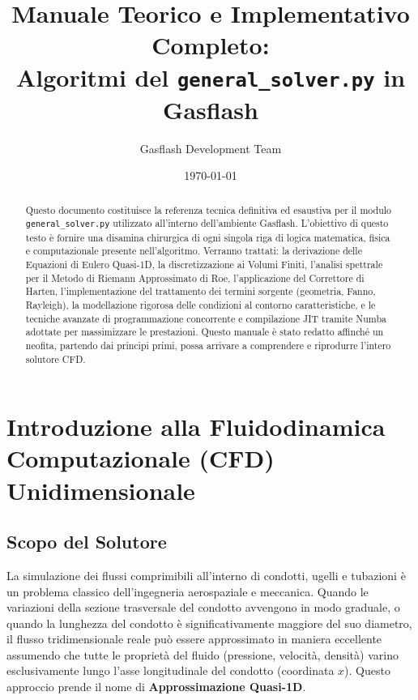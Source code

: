 \documentclass[11pt,a4paper]{article}
\title{\textbf{Manuale Teorico e Implementativo Completo:\\ Algoritmi del \texttt{general\_solver.py} in Gasflash}}
\author{Gasflash Development Team}
\date{\today}
\begin{document}
\maketitle

\begin{abstract}
Questo documento costituisce la referenza tecnica definitiva ed esaustiva per il modulo \texttt{general\_solver.py} utilizzato all'interno dell'ambiente Gasflash. L'obiettivo di questo testo è fornire una disamina chirurgica di ogni singola riga di logica matematica, fisica e computazionale presente nell'algoritmo. Verranno trattati: la derivazione delle Equazioni di Eulero Quasi-1D, la discretizzazione ai Volumi Finiti, l'analisi spettrale per il Metodo di Riemann Approssimato di Roe, l'applicazione del Correttore di Harten, l'implementazione del trattamento dei termini sorgente (geometria, Fanno, Rayleigh), la modellazione rigorosa delle condizioni al contorno caratteristiche, e le tecniche avanzate di programmazione concorrente e compilazione JIT tramite Numba adottate per massimizzare le prestazioni. Questo manuale è stato redatto affinché un neofita, partendo dai principi primi, possa arrivare a comprendere e riprodurre l'intero solutore CFD.
\end{abstract}

\tableofcontents
\newpage

\section{Introduzione alla Fluidodinamica Computazionale (CFD) Unidimensionale}

\subsection{Scopo del Solutore}
La simulazione dei flussi comprimibili all'interno di condotti, ugelli e tubazioni è un problema classico dell'ingegneria aerospaziale e meccanica. Quando le variazioni della sezione trasversale del condotto avvengono in modo graduale, o quando la lunghezza del condotto è significativamente maggiore del suo diametro, il flusso tridimensionale reale può essere approssimato in maniera eccellente assumendo che tutte le proprietà del fluido (pressione, velocità, densità) varino esclusivamente lungo l'asse longitudinale del condotto (coordinata $x$). Questo approccio prende il nome di \textbf{Approssimazione Quasi-1D}.
\end{document}
